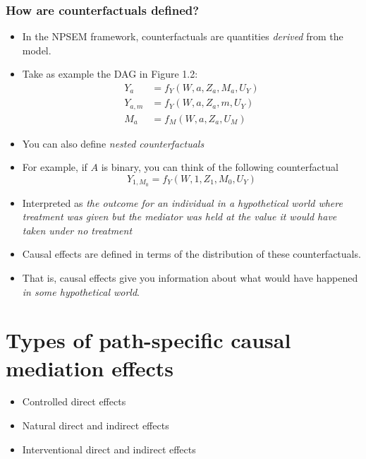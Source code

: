 \documentclass[
  12pt,
]{book}
\providecommand{\tightlist}{%
  \setlength{\itemsep}{0pt}\setlength{\parskip}{0pt}}
\theoremstyle{definition}
\theoremstyle{definition}
\theoremstyle{definition}
\newcommand{\1}{\mathbbm{1}}
\begin{document}
\hypertarget{how-are-counterfactuals-defined}{%
\subsection{How are counterfactuals defined?}\label{how-are-counterfactuals-defined}}

\begin{itemize}
\tightlist
\item
  In the NPSEM framework, counterfactuals are quantities \emph{derived} from the
  model.
\item
  Take as example the DAG in Figure 1.2:
  \begin{align}
    Y_a  &= f_Y(W, a, Z_a, M_a, U_Y)\\
    Y_{a,m}  &= f_Y(W, a, Z_a, m, U_Y)\\
    M_a  &= f_M(W, a, Z_a, U_M)
  \end{align}
\item
  You can also define \emph{nested counterfactuals}
\item
  For example, if \(A\) is binary, you can think of the following counterfactual
  \begin{equation*}
    Y_{1, M_0} = f_Y(W, 1, Z_1, M_0, U_Y)
  \end{equation*}
\item
  Interpreted as \emph{the outcome for an individual in a hypothetical world where
  treatment was given but the mediator was held at the value it would have
  taken under no treatment}
\item
  Causal effects are defined in terms of the distribution of these
  counterfactuals.
\item
  That is, causal effects give you information about what would have happened
  \emph{in some hypothetical world}.
\end{itemize}

\hypertarget{estimands}{%
\chapter{Types of path-specific causal mediation effects}\label{estimands}}

\begin{itemize}
\tightlist
\item
  Controlled direct effects
\item
  Natural direct and indirect effects
\item
  Interventional direct and indirect effects
\end{itemize}
\end{document}
